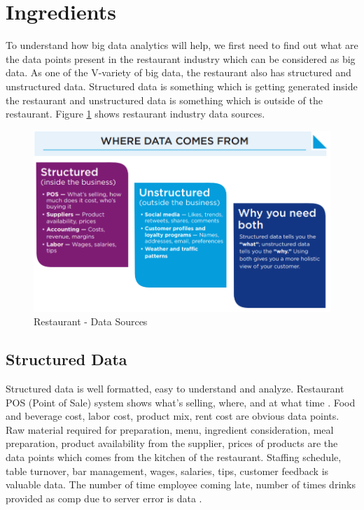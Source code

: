 \documentclass[sigconf]{acmart}
\begin{document}
\section{Ingredients}
To understand how big data analytics will help, we first need to find out what are the data points present in the restaurant industry which can be considered as big data. As one of the V-variety of big data, the restaurant also has structured and unstructured data. Structured data is something which is getting generated inside the restaurant and unstructured data is something which is outside of the restaurant. Figure \ref{F:datasource} shows restaurant industry data sources.
\begin{figure}
\includegraphics[width=\textwidth]{images/datasource}
\caption{Restaurant - Data Sources \cite{www-restaurant}}\label{F:datasource} 
\end{figure}

\subsection{Structured Data}
Structured data is well formatted, easy to understand and analyze. Restaurant POS (Point of Sale) system shows what's selling, where, and at what time \cite{www-qsr}. Food and beverage cost, labor cost, product mix, rent cost are obvious data points. Raw material required for preparation, menu, ingredient consideration, meal preparation, product availability from the supplier, prices of products are the data points which comes from the kitchen of the restaurant. Staffing schedule, table turnover, bar management, wages, salaries, tips, customer feedback is valuable data. The number of time employee coming late, number of times drinks provided as comp due to server error is data \cite{www-restaurant}.
\end{document}
